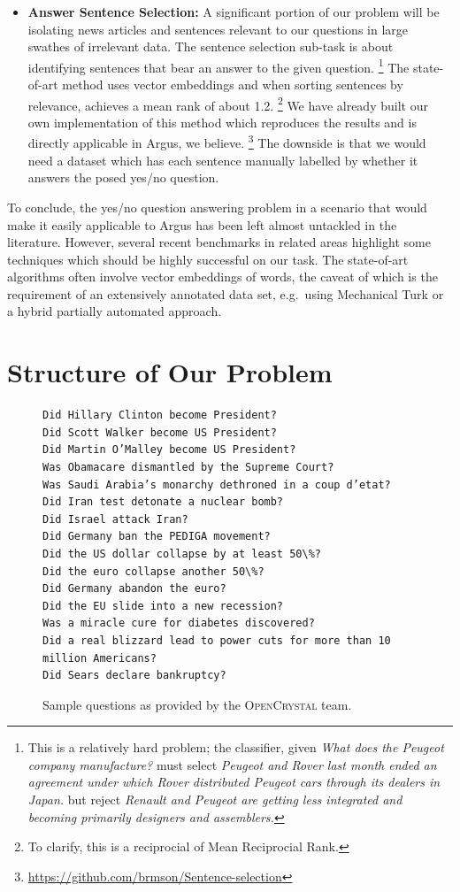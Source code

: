 \documentclass[11pt,a4paper]{article}
\begin{document}
\begin{itemize}
	\item \textbf{Answer Sentence Selection:} A significant portion
		of our problem will be isolating news articles
		and sentences relevant to our questions in large swathes
		of irrelevant data.  The sentence selection sub-task is
		about identifying sentences that bear an answer to the
		given question.%
\footnote{This is a relatively hard problem; the
		classifier, given \textit{What does the Peugeot company manufacture?}
		must select \textit{Peugeot and Rover last month ended an agreement under which Rover distributed Peugeot cars through its dealers in Japan.}
	but reject \textit{Renault and Peugeot are getting less integrated and becoming primarily designers and assemblers.}}
		The state-of-art method \citep{Yu2014Deep} uses vector embeddings
		and when sorting sentences by relevance, achieves a mean rank
		of about 1.2.%
\footnote{To clarify, this is a reciprocial of Mean Reciprocial Rank.}
		We have already built our own implementation of this method
		which reproduces the results and is directly applicable
		in Argus, we believe.%
\footnote{\url{https://github.com/brmson/Sentence-selection}}
		The downside is that we would need a dataset which has
		each sentence manually labelled by whether it answers
		the posed yes/no question.

\end{itemize}

To conclude, the yes/no question answering problem in a scenario that
would make it easily applicable to Argus has been left almost untackled
in the literature.  However, several recent benchmarks in related areas
highlight some techniques which should be highly successful on our task.
The state-of-art algorithms often involve vector embeddings of words,
the caveat of which is the requirement of an extensively annotated
data set, e.g.\ using Mechanical Turk or a hybrid partially automated
approach.

\section{Structure of Our Problem}
\label{structure}

\begin{figure}
\begin{verbatim}
Did Hillary Clinton become President?
Did Scott Walker become US President?
Did Martin O’Malley become US President?
Was Obamacare dismantled by the Supreme Court?
Was Saudi Arabia’s monarchy dethroned in a coup d’etat?
Did Iran test detonate a nuclear bomb?
Did Israel attack Iran?
Did Germany ban the PEDIGA movement?
Did the US dollar collapse by at least 50\%?
Did the euro collapse another 50\%?
Did Germany abandon the euro?
Did the EU slide into a new recession?
Was a miracle cure for diabetes discovered?
Did a real blizzard lead to power cuts for more than 10 million Americans?
Did Sears declare bankruptcy?
\end{verbatim}
	\caption{Sample questions as provided by the \textsc{OpenCrystal} team.}
	\label{fig:sampleq}
\end{figure}
\end{document}
